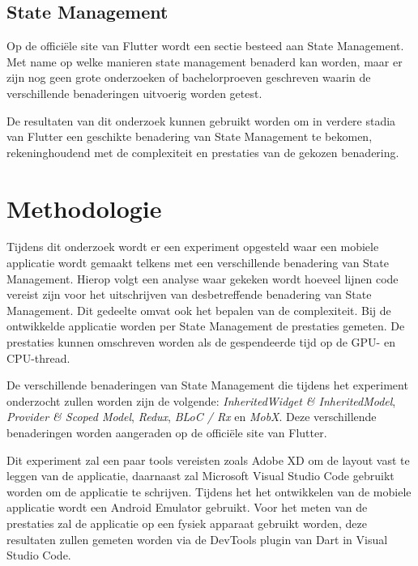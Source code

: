 
\subsection*{State Management}
Op de officiële site van Flutter wordt een sectie besteed aan State Management.
Met name op welke manieren state management benaderd kan worden, maar er zijn nog geen grote
onderzoeken of bachelorproeven geschreven waarin de verschillende benaderingen uitvoerig worden getest.

De resultaten van dit onderzoek kunnen gebruikt worden om in verdere stadia van Flutter
een geschikte benadering van State Management te bekomen, rekeninghoudend met de complexiteit en prestaties
van de gekozen benadering.


\section{Methodologie}
\label{sec:methodologie}
Tijdens dit onderzoek wordt er een experiment opgesteld waar een mobiele applicatie wordt gemaakt 
telkens met een verschillende benadering van State Management. 
Hierop volgt een analyse waar gekeken wordt hoeveel lijnen code vereist zijn voor het uitschrijven van
desbetreffende benadering van State Management. Dit gedeelte omvat ook het bepalen van de complexiteit.
Bij de ontwikkelde applicatie worden per State Management de prestaties gemeten.
De prestaties kunnen omschreven worden als de gespendeerde tijd op de GPU- en CPU-thread.

De verschillende benaderingen van State Management die tijdens het experiment onderzocht zullen worden zijn de volgende: \emph{InheritedWidget \& InheritedModel}, 
\emph{Provider \& Scoped Model}, \emph{Redux}, \emph{BLoC / Rx} en \emph{MobX}.
Deze verschillende benaderingen worden aangeraden op de officiële site van Flutter.

Dit experiment zal een paar tools vereisten zoals Adobe XD om de layout vast te leggen van de applicatie,
daarnaast zal Microsoft Visual Studio Code gebruikt worden om de applicatie te schrijven.
Tijdens het het ontwikkelen van de mobiele applicatie wordt een Android Emulator gebruikt. Voor het meten van de prestaties zal de applicatie op een fysiek apparaat gebruikt worden, deze resultaten zullen gemeten worden via de DevTools plugin van Dart in Visual Studio Code.

